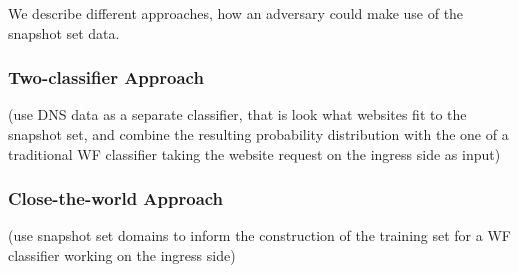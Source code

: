 We describe different approaches, how an adversary could make use of the
snapshot set data.

\subsubsection{Two-classifier Approach}

(use DNS data as a separate classifier, that is look what websites fit
to the snapshot set, and combine the resulting probability distribution
with the one of a traditional WF classifier taking the website request
on the ingress side as input)


\subsubsection{Close-the-world Approach}
(use snapshot set domains to inform the construction of the training set
for a WF classifier working on the ingress side)
